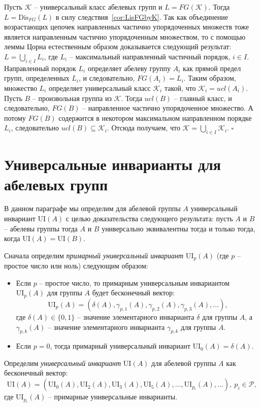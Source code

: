 \documentclass[a4paper,11pt,twoside]{article}
\def\proof{{\noindent{\bf Доказательство.}} }
\def\K{{\mathcal{K}}}
\def\P{{\mathcal{P}}}
\def\ui{{\mathrm{UI}}}
\def\Dis{{\mathrm{Dis}}}
\begin{document}
\proof Пусть $\K$ -- универсальный класс абелевых групп и $L = FG(\K)$. Тогда $L = \Dis_{FG}(L)$ в силу следствия~\ref{cor:LisFGbyK}. Так как объединение возрастающих цепочек направленных частично упорядоченных множеств тоже является направленным частично упорядоченным множеством, то с помощью леммы Цорна естественным образом доказывается следующий результат: $L = \bigcup\limits_{i \in I} L_i$, где $L_i$ -- максимальный направленный частичный порядок, $i \in I$. Направленный порядок $L_i$ определяет абелеву группу $A_i$ как прямой предел групп, определенных $L_i$, и следовательно, $FG(A_i) = L_i$. Таким образом, множество $L_i$ определяет универсальный класс $\K_i$ такой, что $\K_i = ucl(A_i)$. Пусть $B$ -- произвольная группа из $\K$. Тогда $ucl(B)$ -- главный класс, и следовательно, $FG(B)$ -- направленное частично упорядоченное множество. А потому $FG(B)$ содержится в некотором максимальном направленном порядке $L_i$, следовательно $ucl(B) \subseteq \K_i$. Отсюда получаем, что $\K = \bigcup\limits_{i \in I} \K_i$. $\square$


\section{Универсальные инварианты для абелевых групп}

В данном параграфе мы определим для абелевой группы $A$ универсальный инвариант $\ui(A)$ с целью доказательства следующего результата: пусть $A$ и $B$ -- абелевы группы тогда $A$ и $B$ универсально эквивалентны тогда и только тогда, когда $\ui(A) = \ui(B)$.

Сначала определим \textit{примарный универсальный инвариант} $\ui_p(A)$ (где $p$ -- простое число или ноль) следующим образом: 
\begin{itemize}
\item Если $p$ -- простое число, то примарным универсальным инвариантом $\ui_p(A)$ для группы $A$ будет бесконечный вектор:
$$\ui_p(A) = (\delta(A), \gamma_{p,1}(A), \gamma_{p,2}(A), \gamma_{p,3}(A), \ldots),$$
где $\delta(A) \in \{0,1\}$ -- значение элементарного инварианта $\delta$ для группы $A$, а $\gamma_{p,k}(A)$ -- значение элементарного инварианта $\gamma_{p,k}$ для группы $A$.
\item Если $p = 0$, тогда примарный универсальный инвариант $\ui_0(A) = \delta(A)$.
\end{itemize}

Определим \textit{универсальный инвариант} $\ui(A)$ для абелевой группы $A$ как бесконечный вектор:
$$\ui(A) = (\ui_{0}(A), \ui_{2}(A), \ui_{3}(A),\ui_{5}(A),\ldots, \ui_{p_i}(A), \ldots), \ p_i \in \P,$$
где $\ui_{p_i}(A)$ -- примарные универсальные инварианты.
\end{document}
